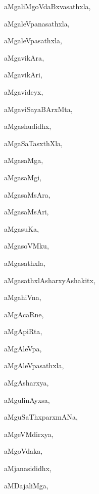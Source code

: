 \begin{multicols}{3}
{\noindent
{aMgaliMgoVdaBxvasathxla}, \pageref{aMgaliMgoVdaBxvasathxla}

\noindent
{aMgaleVpanasathxla}, \pageref{aMgaleVpanasathxla}

\noindent
{aMgaleVpasathxla}, \pageref{aMgaleVpasathxla}

\noindent
{aMgavikAra}, \pageref{aMgavikAra}

\noindent
{aMgavikAri}, \pageref{aMgavikAri}

\noindent
{aMgavideyx}, \pageref{aMgavideyx}

\noindent
{aMgaviSayaBArxMta}, \pageref{aMgaviSayaBArxMta}

\noindent
{aMgashudidhx}, \pageref{aMgashudidhx}

\noindent
{aMgaSaTasxthXla}, \pageref{aMgaSaTasxthXla}

\noindent
{aMgasaMga}, \pageref{aMgasaMga}

\noindent
{aMgasaMgi}, \pageref{aMgasaMgi}

\noindent
{aMgasaMsAra}, \pageref{aMgasaMsAra}

\noindent
{aMgasaMsAri}, \pageref{aMgasaMsAri}

\noindent
{aMgasuKa}, \pageref{aMgasuKa}

\noindent
{aMgasoVMku}, \pageref{aMgasoVMku}

\noindent
{aMgasathxla}, \pageref{aMgasathxla}

\noindent
{aMgasathxlAsharxyAshakitx}, \pageref{aMgasathxlAsharxyAshakitx}

\noindent
{aMgahiVna}, \pageref{aMgahiVna}

\noindent
{aMgAcaRne}, \pageref{aMgAcaRne}

\noindent
{aMgApiRta}, \pageref{aMgApiRta}

\noindent
{aMgAleVpa}, \pageref{aMgAleVpa}

\noindent
{aMgAleVpasathxla}, \pageref{aMgAleVpasathxla}

\noindent
{aMgAsharxya}, \pageref{aMgAsharxya}

\noindent
{aMgulinAyxsa}, \pageref{aMgulinAyxsa}

\noindent
{aMguSaThxparxmANa}, \pageref{aMguSaThxparxmANa}

\noindent
{aMgeVMdirxya}, \pageref{aMgeVMdirxya}

\noindent
{aMgoVdaka}, \pageref{aMgoVdaka}

\noindent
{aMjanasididhx}, \pageref{aMjanasididhx}

\noindent
{aMDajaliMga}, \pageref{aMDajaliMga}

}
\end{multicols}
